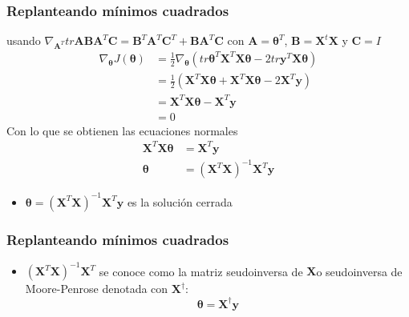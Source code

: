 \documentclass{beamer}
\begin{document}
\begin{frame}
\frametitle{Replanteando mínimos cuadrados}
usando $ \nabla_{\boldsymbol{A}^T}tr \boldsymbol{ABA}^T \boldsymbol{C}= \boldsymbol{B}^T\boldsymbol{A}^T\boldsymbol{C}^T+\boldsymbol{B}\boldsymbol{A}^T\boldsymbol{C}$ con $\boldsymbol{A}= \boldsymbol{\theta}^T$, $\boldsymbol{B}=\boldsymbol{X}^t\boldsymbol{X}$ y $\boldsymbol{C}=I$
\begin{equation*}
\begin{split}
\nabla_{\boldsymbol{\theta}}J(\boldsymbol{\theta})& = \frac{1}{2}\nabla_{\boldsymbol{\theta}}(tr\boldsymbol{\theta}^T \boldsymbol{X}^T\boldsymbol{X} \boldsymbol{\theta}- 2tr \boldsymbol{y}^T \boldsymbol{X} \boldsymbol{\theta}) \\
& = \frac{1}{2} (\boldsymbol{X}^T\boldsymbol{X} \boldsymbol{\theta} + \boldsymbol{X}^T\boldsymbol{X} \boldsymbol{\theta} - 2 \boldsymbol{X}^T\boldsymbol{y})\\
& = \boldsymbol{X}^T\boldsymbol{X} \boldsymbol{\theta} - \boldsymbol{X}^T\boldsymbol{y}\\
&= 0
\end{split}
\end{equation*}
Con lo que se obtienen las ecuaciones normales 
\begin{equation*}
\begin{split}
\boldsymbol{X}^T\boldsymbol{X} \boldsymbol{\theta} & = \boldsymbol{X}^T\boldsymbol{y}\\
\boldsymbol{\theta}& = (\boldsymbol{X}^T\boldsymbol{X})^{-1} \boldsymbol{X}^T \boldsymbol{y}
\end{split}
\end{equation*}
\begin{itemize}
\item $\boldsymbol{\theta} = (\boldsymbol{X}^T\boldsymbol{X})^{-1} \boldsymbol{X}^T \boldsymbol{y}$ es la solución cerrada
\end{itemize}
\end{frame}

\begin{frame}
\frametitle{Replanteando mínimos cuadrados}
\begin{itemize}
\item $(\boldsymbol{X}^T\boldsymbol{X})^{-1} \boldsymbol{X}^T$ se conoce como la matriz seudoinversa de $\boldsymbol{X}$o seudoinversa de Moore-Penrose denotada con $\boldsymbol{X}^{\dagger}$:
\begin{equation*}
\boldsymbol{\theta}=\boldsymbol{X}^{\dagger}\boldsymbol{y}
\end{equation*}
\end{itemize}
\end{frame}
\end{document}
